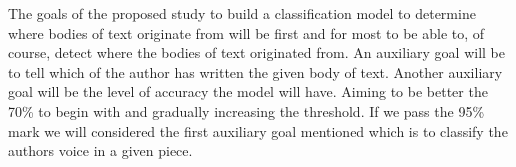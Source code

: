 The goals of the proposed study to build a classification model to determine where bodies of text originate from will be first and for most to be able to, of course, detect where the bodies of text originated from. 
An auxiliary goal will be to tell which of the author has written the given body of text. 
Another auxiliary goal will be the level of accuracy the model will have. 
Aiming to be better the 70\% to begin with and gradually increasing the threshold. 
If we pass the 95\% mark we will considered the first auxiliary goal mentioned which is to classify the authors voice in a given piece. 
